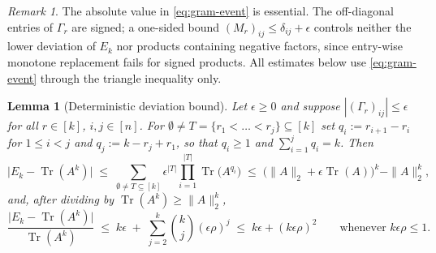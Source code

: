 \documentclass{article}
\newtheorem{lemma}[theorem]{Lemma}
\theoremstyle{remark}
\newtheorem{remark}[theorem]{Remark}
\begin{document}
\begin{remark}\label{rem:twosided}
The absolute value in \eqref{eq:gram-event} is essential. The off-diagonal entries of $\Gamma_r$ are signed; a one-sided bound $(M_r)_{ij} \le \delta_{ij} + \epsilon$ controls neither the lower deviation of $E_k$ nor products containing negative factors, since entry-wise monotone replacement fails for signed products. All estimates below use \eqref{eq:gram-event} through the triangle inequality only.
\end{remark}

\begin{lemma}[Deterministic deviation bound]\label{lem:master}
Let $\epsilon \ge 0$ and suppose $|(\Gamma_r)_{ij}| \le \epsilon$ for all $r \in [k]$, $i,j \in [n]$. For $\emptyset \neq T = \{r_1 < \dots < r_j\} \subseteq [k]$ set $q_i := r_{i+1} - r_i$ for $1 \le i < j$ and $q_j := k - r_j + r_1$, so that $q_i \ge 1$ and $\sum_{i=1}^{j} q_i = k$. Then
\begin{equation}\label{eq:master}
\big| E_k - \operatorname{Tr}(A^k) \big|
\;\le\;
\sum_{\emptyset \neq T \subseteq [k]} \epsilon^{|T|} \prod_{i=1}^{|T|} \operatorname{Tr}\!\big(A^{q_i}\big)
\;\le\;
\big( \|A\|_2 + \epsilon \operatorname{Tr}(A) \big)^k - \|A\|_2^k ,
\end{equation}
and, after dividing by $\operatorname{Tr}(A^k) \ge \|A\|_2^k$,
\begin{equation}\label{eq:master-rel}
\frac{\big| E_k - \operatorname{Tr}(A^k) \big|}{\operatorname{Tr}(A^k)}
\;\le\;
k\epsilon \;+\; \sum_{j=2}^{k} \binom{k}{j} (\epsilon\rho)^j
\;\le\;
k\epsilon + (k\epsilon\rho)^2
\qquad \text{whenever } k\epsilon\rho \le 1 .
\end{equation}
\end{lemma}
\end{document}
